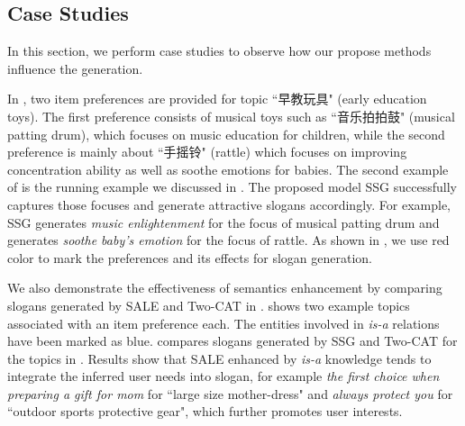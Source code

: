



\subsection{Case Studies}
\label{sec:cases}
In this section, we perform case studies to observe 
how our propose methods influence the generation.


In , %
two item preferences are provided for topic ``早教玩具" (early education toys).
The first preference consists of musical toys such as ``音乐拍拍鼓" (musical patting drum),
which focuses on music education for children,
while the second preference is mainly about ``手摇铃" (rattle) which focuses on improving concentration ability 
as well as soothe emotions for babies.
The second example of 
 is the running example we discussed in .
The proposed model SSG successfully captures those focuses 
and generate attractive slogans accordingly.
For example, SSG generates \emph{music enlightenment}
for the focus of musical patting drum
and generates \emph{soothe baby's emotion } for the focus of 
rattle.
As shown in , 
we use red color to mark the preferences and its effects for slogan generation.

We also demonstrate the effectiveness of semantics enhancement
by comparing slogans generated by SALE and Two-CAT in .
 shows two example topics associated with an item preference each.
The entities involved in \emph{is-a} relations
have been marked as blue. 
 compares slogans generated by SSG and Two-CAT
for the topics in .
Results show that SALE enhanced by \emph{is-a} knowledge 
tends to integrate the inferred user needs into slogan,
for example \emph{the first choice when preparing a gift for mom} for ``large size mother-dress"
and \emph{always protect you} for ``outdoor sports protective gear",
which further promotes user interests.


